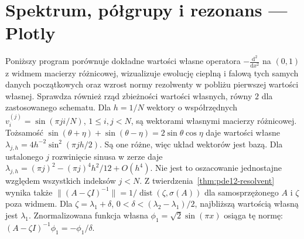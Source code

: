\section{Spektrum, półgrupy i rezonans — Plotly}
\label{sec:pde12-code}
Poniższy program porównuje dokładne wartości własne operatora
$-\frac{\mathrm d^2}{\mathrm dx^2}$ na $(0,1)$ z widmem macierzy
różnicowej, wizualizuje ewolucję cieplną i falową tych samych
danych początkowych oraz wzrost normy rezolwenty w pobliżu
pierwszej wartości własnej. Sprawdza również rząd zbieżności
wartości własnych, równy $2$ dla zastosowanego schematu.
Dla $h=1/N$ wektory o współrzędnych
$v_i^{(j)}=\sin(\pi ji/N)$, $1\le i,j<N$,
są wektorami własnymi macierzy różnicowej.
Tożsamość
$\sin(\theta+\eta)+\sin(\theta-\eta)=2\sin\theta\cos\eta$
daje wartości własne
$\lambda_{j,h}=4h^{-2}\sin^2(\pi jh/2)$.
Są one różne, więc układ wektorów jest bazą.
Dla ustalonego $j$ rozwinięcie sinusa w zerze daje
$\lambda_{j,h}=(\pi j)^2-(\pi j)^4h^2/12+O(h^4)$.
Nie jest to oszacowanie jednostajne względem wszystkich
indeksów $j<N$.
Z twierdzenia~\ref{thm:pde12-resolvent} wynika także
$\|(A-\zeta I)^{-1}\|=1/\operatorname{dist}(\zeta,\sigma(A))$
dla samosprzężonego $A$ i $\zeta$ poza widmem.
Dla $\zeta=\lambda_1+\delta$, $0<\delta<(\lambda_2-\lambda_1)/2$,
najbliższą wartością własną jest $\lambda_1$.
Znormalizowana funkcja własna $\phi_1=\sqrt{2}\sin(\pi x)$
osiąga tę normę: $(A-\zeta I)^{-1}\phi_1=-\phi_1/\delta$.
